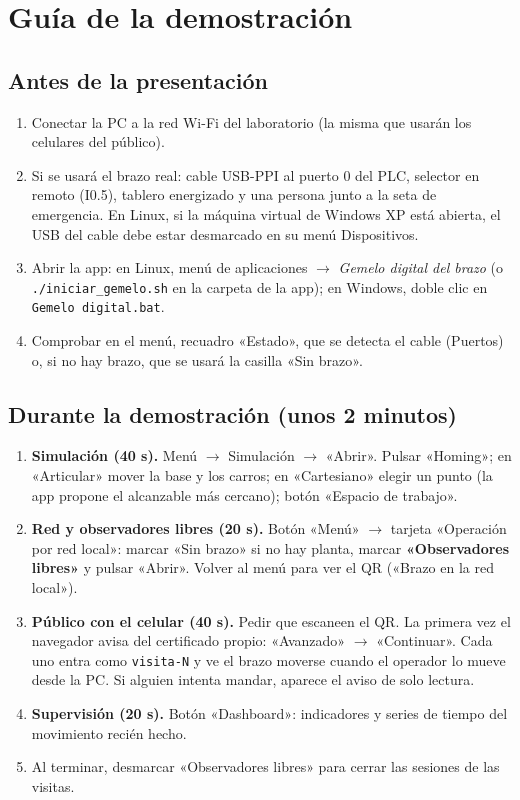 \documentclass[11pt,a4paper]{article}
\newcommand{\codigo}[1]{\texttt{#1}}
\begin{document}
\clearpage
\section{Guía de la demostración}
\subsection{Antes de la presentación}
\begin{enumerate}
\item Conectar la PC a la red Wi-Fi del laboratorio (la misma que usarán los celulares del público).
\item Si se usará el brazo real: cable USB-PPI al puerto 0 del PLC, selector en remoto (I0.5), tablero energizado y una persona junto a la seta de emergencia. En Linux, si la máquina virtual de Windows XP está abierta, el USB del cable debe estar desmarcado en su menú Dispositivos.
\item Abrir la app: en Linux, menú de aplicaciones $\rightarrow$ \emph{Gemelo digital del brazo} (o \codigo{./iniciar\_gemelo.sh} en la carpeta de la app); en Windows, doble clic en \codigo{Gemelo digital.bat}.
\item Comprobar en el menú, recuadro «Estado», que se detecta el cable (Puertos) o, si no hay brazo, que se usará la casilla «Sin brazo».
\end{enumerate}

\subsection{Durante la demostración (unos 2 minutos)}
\begin{enumerate}
\item \textbf{Simulación (40 s).} Menú $\rightarrow$ Simulación $\rightarrow$ «Abrir». Pulsar «Homing»; en «Articular» mover la base y los carros; en «Cartesiano» elegir un punto (la app propone el alcanzable más cercano); botón «Espacio de trabajo».
\item \textbf{Red y observadores libres (20 s).} Botón «Menú» $\rightarrow$ tarjeta «Operación por red local»: marcar «Sin brazo» si no hay planta, marcar \textbf{«Observadores libres»} y pulsar «Abrir». Volver al menú para ver el QR («Brazo en la red local»).
\item \textbf{Público con el celular (40 s).} Pedir que escaneen el QR. La primera vez el navegador avisa del certificado propio: «Avanzado» $\rightarrow$ «Continuar». Cada uno entra como \codigo{visita-N} y ve el brazo moverse cuando el operador lo mueve desde la PC. Si alguien intenta mandar, aparece el aviso de solo lectura.
\item \textbf{Supervisión (20 s).} Botón «Dashboard»: indicadores y series de tiempo del movimiento recién hecho.
\item Al terminar, desmarcar «Observadores libres» para cerrar las sesiones de las visitas.
\end{enumerate}
\end{document}
